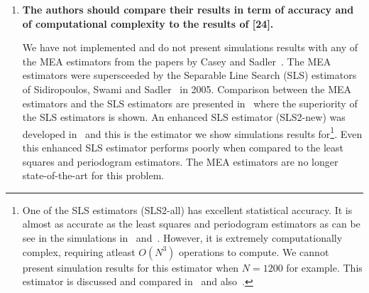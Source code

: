 \documentclass[a4paper,10pt]{article}
\begin{document}
\begin{enumerate}
\begin{enumerate}
Section VI in the paper~\cite{726812} entitled ``On periodic pulse interval analysis with outliers and missing observations'' is not the conclusion.  It is the section entitled ``Numerical Results''.  In Figures 1 to 4 in~\cite{726812} the periogram estimator implemented by Casey and Sadler is seen to be inferior to their MEA estimator.  Casey and Sadler do use an FFT to compute the periodgram, but fail to implement an optimisation proceedure. %
Casey and Sadler arrive at the conclusion that very large FFTs are required and that the periodgram estimator is not particularly accurate.  In the conclusion of~\cite{726812} it is stated that:

``Comparisons with the periodogram show the limitations of periodogram performance.''

Our paper clearly shows that such limitation do not exist.  The periodgram estimator, computed by quantization and FFT and combined with an appropriate optimisation proceedure, is both compuationally efficient and highly accurate.  For moderately large $N$ this is the most computationally efficient proceedure currently available for this problem.  Simultaneously, it is as accurate at the most accurate estimators available, namely the least squares estimator, and the periodgram estimator computed directly without FFT.

\item \textbf{ The authors should
compare their results in term of accuracy and of computational complexity to
the results of [24].}

We have not implemented and do not present simulations results with any of the MEA estimators from the papers by Casey and Sadler~\cite{536682,726812}.  The MEA estimators were supersceeded by the Separable Line Search (SLS) estimators of Sidiropoulos, Swami and Sadler~\cite{Sidiropoulos2005} in 2005.  Comparison between the MEA estimators and the SLS estimators are presented in~\cite{Sidiropoulos2005} where the superiority of the SLS estimators is shown.  An enhanced SLS estimator (SLS2-new) was developed in~\cite{Clarkson2007} and this is the estimator we show simulations results for\footnote{One of the SLS estimators (SLS2-all) has excellent statistical accuracy.  It is almost as accurate as the least squares and periodogram estimators as can be see in the simulations in~\cite{Clarkson2007} and~\cite{McKilliam2007}.  However, it is extremely computationally complex, requiring atleast $O(N^3)$ operations to compute.  We cannot present simulation results for this estimator when $N=1200$ for example.  This estimator is discussed and compared in~\cite{Sidiropoulos2005} and also~\cite{Clarkson2007,McKilliam2007}.}.  Even this enhanced SLS estimator performs poorly when compared to the least squares and periodogram estimators.  The MEA estimators are no longer state-of-the-art for this problem.


\end{enumerate}
\end{enumerate}
\end{document}
